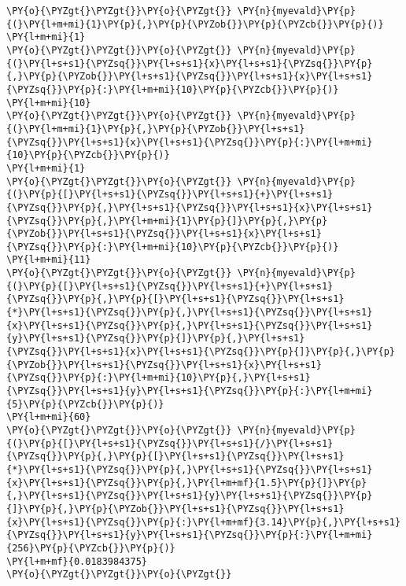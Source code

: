 \begin{Verbatim}[commandchars=\\\{\}]
\PY{o}{\PYZgt{}\PYZgt{}}\PY{o}{\PYZgt{}} \PY{n}{myevald}\PY{p}{(}\PY{l+m+mi}{1}\PY{p}{,}\PY{p}{\PYZob{}}\PY{p}{\PYZcb{}}\PY{p}{)}
\PY{l+m+mi}{1}
\PY{o}{\PYZgt{}\PYZgt{}}\PY{o}{\PYZgt{}} \PY{n}{myevald}\PY{p}{(}\PY{l+s+s1}{\PYZsq{}}\PY{l+s+s1}{x}\PY{l+s+s1}{\PYZsq{}}\PY{p}{,}\PY{p}{\PYZob{}}\PY{l+s+s1}{\PYZsq{}}\PY{l+s+s1}{x}\PY{l+s+s1}{\PYZsq{}}\PY{p}{:}\PY{l+m+mi}{10}\PY{p}{\PYZcb{}}\PY{p}{)}
\PY{l+m+mi}{10}
\PY{o}{\PYZgt{}\PYZgt{}}\PY{o}{\PYZgt{}} \PY{n}{myevald}\PY{p}{(}\PY{l+m+mi}{1}\PY{p}{,}\PY{p}{\PYZob{}}\PY{l+s+s1}{\PYZsq{}}\PY{l+s+s1}{x}\PY{l+s+s1}{\PYZsq{}}\PY{p}{:}\PY{l+m+mi}{10}\PY{p}{\PYZcb{}}\PY{p}{)}
\PY{l+m+mi}{1}
\PY{o}{\PYZgt{}\PYZgt{}}\PY{o}{\PYZgt{}} \PY{n}{myevald}\PY{p}{(}\PY{p}{[}\PY{l+s+s1}{\PYZsq{}}\PY{l+s+s1}{+}\PY{l+s+s1}{\PYZsq{}}\PY{p}{,}\PY{l+s+s1}{\PYZsq{}}\PY{l+s+s1}{x}\PY{l+s+s1}{\PYZsq{}}\PY{p}{,}\PY{l+m+mi}{1}\PY{p}{]}\PY{p}{,}\PY{p}{\PYZob{}}\PY{l+s+s1}{\PYZsq{}}\PY{l+s+s1}{x}\PY{l+s+s1}{\PYZsq{}}\PY{p}{:}\PY{l+m+mi}{10}\PY{p}{\PYZcb{}}\PY{p}{)}
\PY{l+m+mi}{11}
\PY{o}{\PYZgt{}\PYZgt{}}\PY{o}{\PYZgt{}} \PY{n}{myevald}\PY{p}{(}\PY{p}{[}\PY{l+s+s1}{\PYZsq{}}\PY{l+s+s1}{+}\PY{l+s+s1}{\PYZsq{}}\PY{p}{,}\PY{p}{[}\PY{l+s+s1}{\PYZsq{}}\PY{l+s+s1}{*}\PY{l+s+s1}{\PYZsq{}}\PY{p}{,}\PY{l+s+s1}{\PYZsq{}}\PY{l+s+s1}{x}\PY{l+s+s1}{\PYZsq{}}\PY{p}{,}\PY{l+s+s1}{\PYZsq{}}\PY{l+s+s1}{y}\PY{l+s+s1}{\PYZsq{}}\PY{p}{]}\PY{p}{,}\PY{l+s+s1}{\PYZsq{}}\PY{l+s+s1}{x}\PY{l+s+s1}{\PYZsq{}}\PY{p}{]}\PY{p}{,}\PY{p}{\PYZob{}}\PY{l+s+s1}{\PYZsq{}}\PY{l+s+s1}{x}\PY{l+s+s1}{\PYZsq{}}\PY{p}{:}\PY{l+m+mi}{10}\PY{p}{,}\PY{l+s+s1}{\PYZsq{}}\PY{l+s+s1}{y}\PY{l+s+s1}{\PYZsq{}}\PY{p}{:}\PY{l+m+mi}{5}\PY{p}{\PYZcb{}}\PY{p}{)}
\PY{l+m+mi}{60}
\PY{o}{\PYZgt{}\PYZgt{}}\PY{o}{\PYZgt{}} \PY{n}{myevald}\PY{p}{(}\PY{p}{[}\PY{l+s+s1}{\PYZsq{}}\PY{l+s+s1}{/}\PY{l+s+s1}{\PYZsq{}}\PY{p}{,}\PY{p}{[}\PY{l+s+s1}{\PYZsq{}}\PY{l+s+s1}{*}\PY{l+s+s1}{\PYZsq{}}\PY{p}{,}\PY{l+s+s1}{\PYZsq{}}\PY{l+s+s1}{x}\PY{l+s+s1}{\PYZsq{}}\PY{p}{,}\PY{l+m+mf}{1.5}\PY{p}{]}\PY{p}{,}\PY{l+s+s1}{\PYZsq{}}\PY{l+s+s1}{y}\PY{l+s+s1}{\PYZsq{}}\PY{p}{]}\PY{p}{,}\PY{p}{\PYZob{}}\PY{l+s+s1}{\PYZsq{}}\PY{l+s+s1}{x}\PY{l+s+s1}{\PYZsq{}}\PY{p}{:}\PY{l+m+mf}{3.14}\PY{p}{,}\PY{l+s+s1}{\PYZsq{}}\PY{l+s+s1}{y}\PY{l+s+s1}{\PYZsq{}}\PY{p}{:}\PY{l+m+mi}{256}\PY{p}{\PYZcb{}}\PY{p}{)}
\PY{l+m+mf}{0.0183984375}
\PY{o}{\PYZgt{}\PYZgt{}}\PY{o}{\PYZgt{}}
\end{Verbatim}

